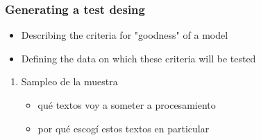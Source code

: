 \documentclass[twoside]{article}
\begin{document}
\subsubsection{Generating a test desing}
\label{sec:org4e4267f}


\begin{itemize}
\item Describing the criteria for "goodness" of a model
\item Defining the data on which these criteria will be tested
\end{itemize}
\begin{enumerate}
\item Sampleo de la muestra
\label{sec:org4dd3208}
\begin{itemize}
\item qué textos voy a someter a procesamiento
\item por qué escogí estos textos en particular
\end{itemize}
\end{enumerate}
\end{document}

